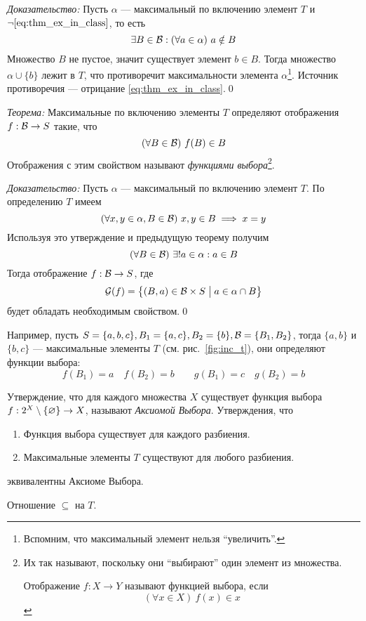 {\it Доказательство:}
Пусть $\alpha$ --- максимальный по включению элемент $T$ и
$\lnot\eqref{eq:thm_ex_in_class}$, то есть
\[
  \exists B\in\mathcal B:(\forall a\in\alpha)~a\notin B
\]
Множество $B$ не пустое, значит существует элемент $b\in B$.
Тогда множество $\alpha\cup \{b\}$ лежит в $T$, что противоречит
максимальности элемента $\alpha$\footnote{Вспомним, что максимальный элемент
  нельзя ``увеличить''.}.
Источник противоречия --- отрицание \eqref{eq:thm_ex_in_class}.\qed

\vspace{1em}
{\it Теорема:} Максимальные по включению элементы $T$ определяют
отображения $f:\mathcal B\to S$ такие, что
\[
  (\forall B\in\mathcal B)~f(B)\in B
\]
Отображения с этим свойством
называют {\it функциями выбора}\footnote{Их так называют, поскольку
  они ``выбирают'' один элемент из множества.

  Отображение $f:X\to Y$ называют функцией выбора, если
  \[
    (\forall x\in X)~f(x)\in x
  \]
}.

{\it Доказательство:} Пусть $\alpha$ --- максимальный по включению
элемент $T$. По определению $T$ имеем
\[
  (\forall x,y\in\alpha,B\in\mathcal B)~x,y\in B\implies x=y
\]
Используя это утверждение и предыдущую теорему получим
\[
  (\forall B\in\mathcal B)~\exists !a\in\alpha:a\in B
\]
Тогда отображение $f:\mathcal B\to S$, где
\[
  \mathcal G(f)=\left\{(B,a)\in \mathcal B\times S\;\big|\; a\in\alpha\cap B\right\}
\]
будет обладать необходимым свойством.\qed

Например, пусть ${S=\{a,b,c\}, B_1=\{a,c\}, B_2=\{b\},\mathcal B=\{B_1,B_2\}}$,
тогда $\{a,b\}$ и $\{b,c\}$ --- максимальные элементы $T$
(см. рис.~\ref{fig:inc_t}),
они определяют функции выбора:
\[
  f(B_1)=a\quad f(B_2)=b\qquad g(B_1)=c\quad g(B_2)=b
\]

Утверждение, что для каждого множества $X$ существует функция
выбора $f:2^{X}\setminus\{\varnothing\}\to X$,
называют {\it Аксиомой Выбора}.
Утверждения, что
\begin{enumerate}
  \item{}Функция выбора существует для каждого разбиения.
  \item{}Максимальные элементы $T$ существуют для любого разбиения.
\end{enumerate}
эквивалентны Аксиоме Выбора.

\begin{marginfigure}[-9cm]
  \center

  \caption{Отношение $\subseteq$ на $T$.}\label{fig:inc_t}
\end{marginfigure}

